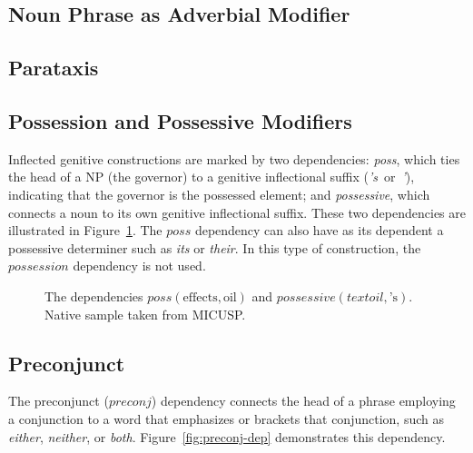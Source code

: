 \documentclass[main.tex]{subfiles}
\begin{document}
\subsection{Noun Phrase as Adverbial Modifier}



\subsection{Parataxis}
\subsection{Possession and Possessive Modifiers}

Inflected genitive constructions are marked by two dependencies: \textit{poss}, which ties the head of a NP (the governor) to a genitive inflectional suffix (\textit{'s}~or~\textit{'}), indicating that the governor is the possessed element; and \textit{possessive}, which connects a noun to its own genitive inflectional suffix. These two dependencies are illustrated in Figure~\ref{fig:poss-deps}. The $poss$ dependency can also have as its dependent a possessive determiner such as \textit{its} or \textit{their}. In this type of construction, the $possession$ dependency is not used. 

\begin{figure}[htbp]
\caption{The dependencies $poss(\text{effects}, \text{oil})$ and $possessive(text{oil}, \text{'s})$. Native sample taken from MICUSP.}
\centering
{}
\label{fig:poss-deps}
\end{figure}

\subsection{Preconjunct}

The preconjunct ($preconj$) dependency connects the head of a phrase employing a conjunction to a word that emphasizes or brackets that conjunction, such as \textit{either}, \textit{neither}, or \textit{both}. Figure~\ref{fig:preconj-dep} demonstrates this dependency.
\end{document}
